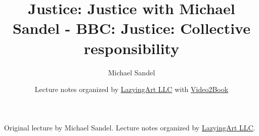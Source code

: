 \documentclass[11pt,oneside]{book}
\begin{document}
\frontmatter
\title{Justice: Justice with Michael Sandel - BBC: Justice: Collective responsibility}
\author{Michael Sandel}
\date{Lecture notes organized by \href{https://lazying.art}{LazyingArt LLC} with \href{https://github.com/lachlanchen/Video2Book}{Video2Book}}
\maketitle
\begin{center}
\small Original lecture by Michael Sandel. Lecture notes organized by \href{https://lazying.art}{LazyingArt LLC}.
\end{center}
\clearpage
\mainmatter

\end{document}
